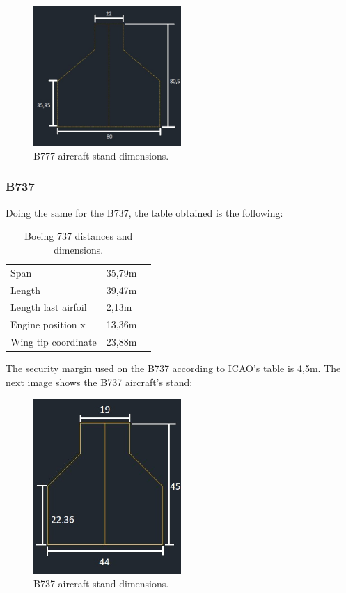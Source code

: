 		\begin{figure}[H]
			\centering
			\includegraphics[clip, trim=0cm 0cm 0cm 0cm, width=0.5\textwidth]{./images/B777/StandB777}
			\caption{B777 aircraft stand dimensions.} %
			\label{} %
		\end{figure}
				
		\subsubsection{B737}
		Doing the same for the B737, the table obtained is the following:
		
		\begin{table}[htb]
			\centering
			\begin{tabular}{ll p{5cm}}
				\midrule[2pt]
				Span & 35,79m\\
				Length & 39,47m\\
				Length last airfoil& 2,13m \\
				Engine position x & 13,36m\\
				Wing tip coordinate & 23,88m\\
				\bottomrule[2pt]
			\end{tabular}
			\caption{Boeing 737 distances and dimensions.}
			\label{Boeing737distances}
		\end{table}
		
		The security margin used on the B737 according to ICAO's table is 4,5m.
		The next image shows the B737 aircraft's stand:
		
		\begin{figure}[H]
			\centering
			\includegraphics[clip, trim=0cm 0cm 0cm 0cm, width=0.5\textwidth]{./images/B737/StandB737}
			\caption{B737 aircraft stand dimensions.} %
			\label{} %
		\end{figure}
			
